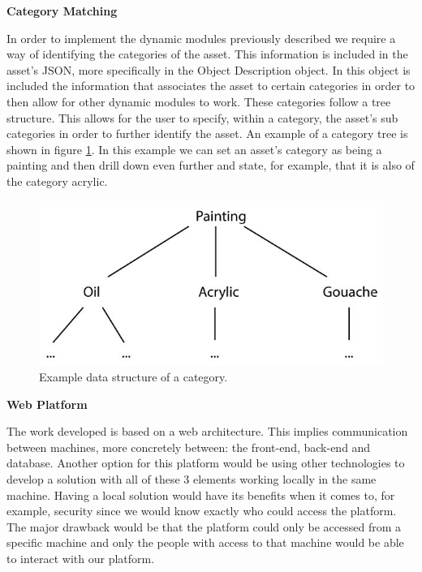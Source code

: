 \vspace{4mm}
\textbf{Category Matching}
\vspace{2mm}

In order to implement the dynamic modules previously described we require a way of identifying the categories of the asset. This information is included in the asset's JSON, more specifically in the Object Description object. In this object is included the information that associates the asset to certain categories in order to then allow for other dynamic modules to work. These categories follow a tree structure. This allows for the user to specify, within a category, the asset's sub categories in order to further identify the asset.
An example of a category tree is shown in figure \ref{paintingsTree}. In this example we can set an asset's category as being a painting and then drill down even further and state, for example, that it is also of the category acrylic.

\begin{figure}[h!]
    \centering
    \includegraphics[scale=0.4]{images/Architecture/paintingsTree.jpg}
    \caption[Category tree example]{Example data structure of a category.}
    \label{paintingsTree}
\end{figure}

\vspace{4mm}
\textbf{Web Platform}
\vspace{2mm}

The work developed is based on a web architecture. This implies communication between machines, more concretely between: the front-end, back-end and database. Another option for this platform would be using other technologies to develop a solution with all of these 3 elements working locally in the same machine. Having a local solution would have its benefits when it comes to, for example, security since we would know exactly who could access the platform. The major drawback would be that the platform could only be accessed from a specific machine and only the people with access to that machine would be able to interact with our platform.


